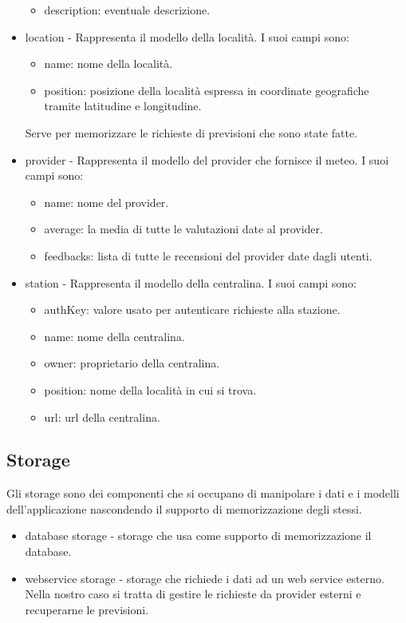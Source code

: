 \begin{itemize}
\begin{itemize}
    \item description: eventuale descrizione.
\end{itemize}
\item location - Rappresenta il modello della località. I suoi campi sono:
\begin{itemize}
    \item name: nome della località.
    \item position: posizione della località espressa in coordinate geografiche tramite latitudine e longitudine.
\end{itemize}
Serve per memorizzare le richieste di previsioni che sono state fatte.
\item provider - Rappresenta il modello del provider che fornisce il meteo. I suoi campi sono:
\begin{itemize}
    \item name: nome del provider.
    \item average: la media di tutte le valutazioni date al provider.
    \item feedbacks: lista di tutte le recensioni del provider date dagli utenti.
\end{itemize}
\item station - Rappresenta  il modello della centralina. I suoi campi sono:
\begin{itemize}
    \item authKey: valore usato per autenticare richieste alla stazione.
    \item name: nome della centralina.
    \item owner: proprietario della centralina.
    \item position: nome della località in cui si trova.
    \item url: url della centralina.
\end{itemize}
\end{itemize}
\subsection{Storage}
Gli storage sono dei componenti che si occupano di manipolare i dati e i modelli dell'applicazione nascondendo il supporto di memorizzazione degli stessi. 
\begin{itemize}
\item{database storage} - storage che usa come supporto di memorizzazione il database.
\item{webservice storage} - storage che richiede i dati ad un web service esterno. Nella nostro caso si tratta di gestire le richieste da provider esterni e recuperarne le previsioni.


\end{itemize}





